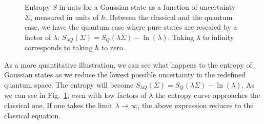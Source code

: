 \documentclass{article}
\begin{document}
\begin{figure}[h]
    \centering
{}
    \caption{Entropy $S$ in nats for a Gaussian state as a function of uncertainty $\Sigma$, measured in units of $\hbar$. Between the classical and the quantum case, we have the quantum case where pure states are rescaled by a factor of $\lambda$: $S_{\lambda Q}(\Sigma) = S_Q(\lambda \Sigma) - \ln(\lambda)$. Taking $\lambda$ to infinity corresponds to taking $\hbar$ to zero.}
    \label{fig:uncertainty_scaled}
\end{figure}

As a more quantitative illustration, we can see what happens to the entropy of Gaussian states as we reduce the lowest possible uncertainty in the redefined quantum space. The entropy will become $S_{\lambda Q}(\Sigma) = S_Q(\lambda \Sigma) - \ln(\lambda)$. As we can see in Fig.~\ref{fig:uncertainty_scaled}, even with low factors of $\lambda$ the entropy curve approaches the classical one. If one takes the limit $\lambda \to \infty$, the above expression reduces to the classical equation.
\end{document}
